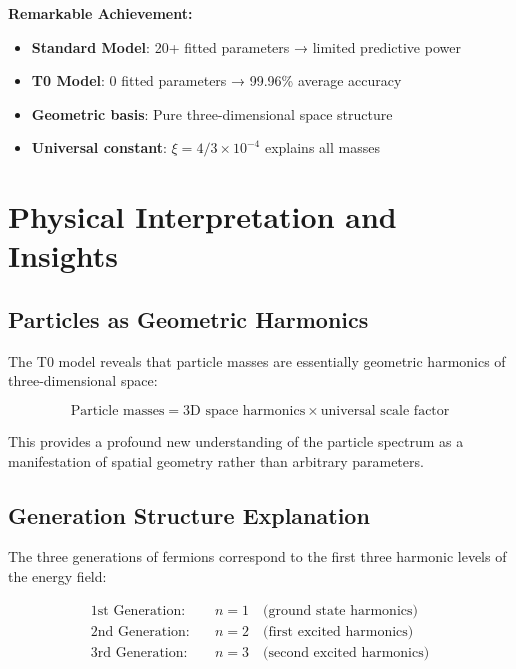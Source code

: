 \documentclass[12pt,a4paper]{report}
\begin{document}
\begin{tcolorbox}[colback=blue!5!white,colframe=blue!75!black,title=Parameter-Free Success]
	\textbf{Remarkable Achievement:}
	\begin{itemize}
		\item \textbf{Standard Model}: 20+ fitted parameters → limited predictive power
		\item \textbf{T0 Model}: 0 fitted parameters → 99.96\% average accuracy
		\item \textbf{Geometric basis}: Pure three-dimensional space structure
		\item \textbf{Universal constant}: $\xi = 4/3 \times 10^{-4}$ explains all masses
	\end{itemize}
\end{tcolorbox}

\section{Physical Interpretation and Insights}
\label{sec:physical_interpretation}

\subsection{Particles as Geometric Harmonics}
\label{subsec:geometric_harmonics}

The T0 model reveals that particle masses are essentially geometric harmonics of three-dimensional space:

\begin{equation}
	\text{Particle masses} = \text{3D space harmonics} \times \text{universal scale factor}
\end{equation}

This provides a profound new understanding of the particle spectrum as a manifestation of spatial geometry rather than arbitrary parameters.

\subsection{Generation Structure Explanation}
\label{subsec:generation_structure}

The three generations of fermions correspond to the first three harmonic levels of the energy field:

\begin{align}
	\text{1st Generation:} &\quad n = 1 \quad \text{(ground state harmonics)} \\
	\text{2nd Generation:} &\quad n = 2 \quad \text{(first excited harmonics)} \\
	\text{3rd Generation:} &\quad n = 3 \quad \text{(second excited harmonics)}
\end{align}
\end{document}

